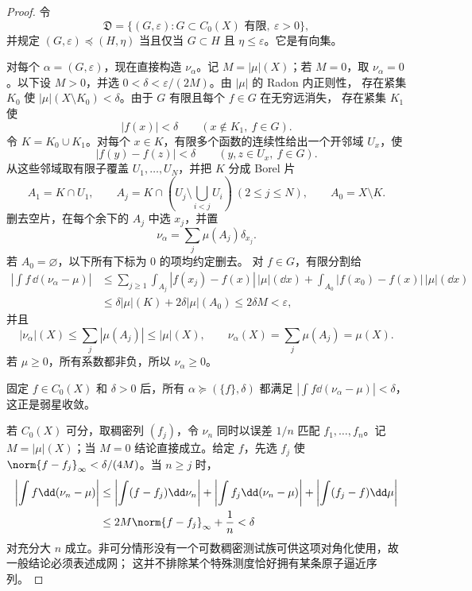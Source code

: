 \begin{proof}
令
\[
 \mathfrak D=\{(G,\varepsilon):G\subset C_0(X)\text{ 有限},\ \varepsilon>0\},
\]
并规定
$(G,\varepsilon)\preceq(H,\eta)$ 当且仅当 $G\subset H$ 且 $\eta\le\varepsilon$。它是有向集。

对每个 $\alpha=(G,\varepsilon)$，现在直接构造 $\nu_\alpha$。记 $M=|\mu|(X)$；若 $M=0$，取
$\nu_\alpha=0$。以下设 $M>0$，并选 $0<\delta<\varepsilon/(2M)$。由 $|\mu|$ 的 Radon 内正则性，
存在紧集 $K_0$ 使 $|\mu|(X\setminus K_0)<\delta$。由于 $G$ 有限且每个 $f\in G$ 在无穷远消失，
存在紧集 $K_1$ 使
\[
 |f(x)|<\delta\qquad(x\notin K_1,\ f\in G).
\]
令 $K=K_0\cup K_1$。对每个 $x\in K$，有限多个函数的连续性给出一个开邻域 $U_x$，使
\[
 |f(y)-f(z)|<\delta\qquad(y,z\in U_x,\ f\in G).
\]
从这些邻域取有限子覆盖 $U_1,\ldots,U_N$，并把 $K$ 分成 Borel 片
\[
 A_1=K\cap U_1,\qquad
 A_j=K\cap\left(U_j\setminus\bigcup_{i<j}U_i\right)\ (2\le j\le N),
 \qquad A_0=X\setminus K.
\]
删去空片，在每个余下的 $A_j$ 中选 $x_j$，并置
\[
 \nu_\alpha=\sum_j\mu(A_j)\delta_{x_j}.
\]
若 $A_0=\varnothing$，以下所有下标为 $0$ 的项均约定删去。
对 $f\in G$，有限分割给
\begin{align*}
 \left|\int f\,\dd(\nu_\alpha-\mu)\right|
 &\leq\sum_{j\geq1}\int_{A_j}|f(x_j)-f(x)|\,|\mu|(\dd x)
      +\int_{A_0}|f(x_0)-f(x)|\,|\mu|(\dd x)\\
 &\leq\delta|\mu|(K)+2\delta|\mu|(A_0)
 \leq2\delta M<\varepsilon,
\end{align*}
并且
\[
 |\nu_\alpha|(X)\leq\sum_j|\mu(A_j)|\leq|\mu|(X),
 \qquad
 \nu_\alpha(X)=\sum_j\mu(A_j)=\mu(X).
\]
若 $\mu\geq0$，所有系数都非负，所以 $\nu_\alpha\geq0$。

固定 $f\in C_0(X)$ 和 $\delta>0$ 后，所有
$\alpha\succeq(\{f\},\delta)$ 都满足
$|\int f\dd(\nu_\alpha-\mu)|<\delta$，这正是弱星收敛。

若 $C_0(X)$ 可分，取稠密列 $(f_j)$，令 $\nu_n$ 同时以误差 $1/n$ 匹配
$f_1,\ldots,f_n$。记 $M=|\mu|(X)$；当 $M=0$ 结论直接成立。给定 $f$，先选 $f_j$ 使
$\norm{f-f_j}_\infty<\delta/(4M)$。当 $n\ge j$ 时，
\begin{align*}
 \left|\int f\dd(\nu_n-\mu)\right|
 &\le\left|\int(f-f_j)\dd\nu_n\right|
   +\left|\int f_j\dd(\nu_n-\mu)\right|
   +\left|\int(f_j-f)\dd\mu\right|\\
 &\le2M\norm{f-f_j}_\infty+\frac1n<\delta
\end{align*}
对充分大 $n$ 成立。非可分情形没有一个可数稠密测试族可供这项对角化使用，故一般结论必须表述成网；
这并不排除某个特殊测度恰好拥有某条原子逼近序列。
\end{proof}

